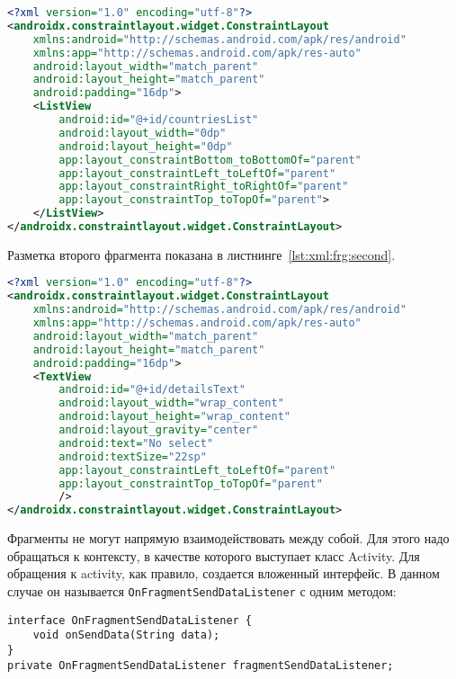 \begin{lstlisting}[language=XML
	, caption=\leftline{}
	, label=lst:xml:frg:first
	]
<?xml version="1.0" encoding="utf-8"?>
<androidx.constraintlayout.widget.ConstraintLayout
    xmlns:android="http://schemas.android.com/apk/res/android"
    xmlns:app="http://schemas.android.com/apk/res-auto"
    android:layout_width="match_parent"
    android:layout_height="match_parent"
    android:padding="16dp">
    <ListView
        android:id="@+id/countriesList"
        android:layout_width="0dp"
        android:layout_height="0dp"
        app:layout_constraintBottom_toBottomOf="parent"
        app:layout_constraintLeft_toLeftOf="parent"
        app:layout_constraintRight_toRightOf="parent"
        app:layout_constraintTop_toTopOf="parent">
    </ListView>
</androidx.constraintlayout.widget.ConstraintLayout>
\end{lstlisting}

Разметка второго фрагмента показана в листнинге~\ref{lst:xml:frg:second}.

\begin{lstlisting}[language=XML
	, caption=\leftline{}
	, label=lst:xml:frg:second
	]
<?xml version="1.0" encoding="utf-8"?>
<androidx.constraintlayout.widget.ConstraintLayout
    xmlns:android="http://schemas.android.com/apk/res/android"
    xmlns:app="http://schemas.android.com/apk/res-auto"
    android:layout_width="match_parent"
    android:layout_height="match_parent"
    android:padding="16dp">
    <TextView
        android:id="@+id/detailsText"
        android:layout_width="wrap_content"
        android:layout_height="wrap_content"
        android:layout_gravity="center"
        android:text="No select"
        android:textSize="22sp"
        app:layout_constraintLeft_toLeftOf="parent"
        app:layout_constraintTop_toTopOf="parent"
        />
</androidx.constraintlayout.widget.ConstraintLayout>
\end{lstlisting}

Фрагменты не могут напрямую взаимодействовать между собой. Для этого
надо обращаться к контексту, в качестве которого выступает класс Activity.
Для обращения к activity, как правило, создается вложенный интерфейс. В
данном случае он называется \texttt{OnFragmentSendDataListener} с одним
методом:

\begin{verbatim}
interface OnFragmentSendDataListener {
	void onSendData(String data);
}
private OnFragmentSendDataListener fragmentSendDataListener;
\end{verbatim}

